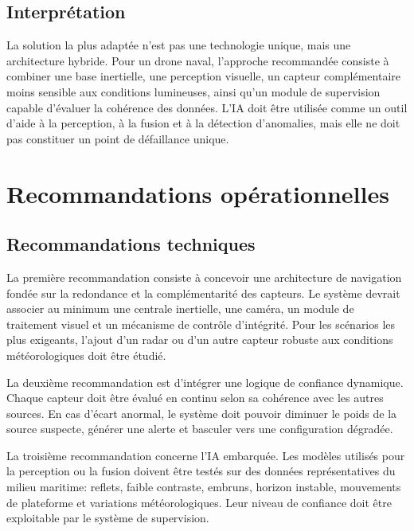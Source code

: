 \documentclass[12pt, a4paper, twoside, openright]{report}
\begin{document}
\section{Interprétation}
La solution la plus adaptée n’est pas une technologie unique, mais une architecture hybride. Pour un drone naval, l’approche recommandée consiste à combiner une base inertielle, une perception visuelle, un capteur complémentaire moins sensible aux conditions lumineuses, ainsi qu’un module de supervision capable d’évaluer la cohérence des données. L’IA doit être utilisée comme un outil d’aide à la perception, à la fusion et à la détection d’anomalies, mais elle ne doit pas constituer un point de défaillance unique.

\cleardoublepage

\chapter{Recommandations opérationnelles}\label{chap:recommandations}

\section{Recommandations techniques}
La première recommandation consiste à concevoir une architecture de navigation fondée sur la redondance et la complémentarité des capteurs. Le système devrait associer au minimum une centrale inertielle, une caméra, un module de traitement visuel et un mécanisme de contrôle d’intégrité. Pour les scénarios les plus exigeants, l’ajout d’un radar ou d’un autre capteur robuste aux conditions météorologiques doit être étudié.

La deuxième recommandation est d’intégrer une logique de confiance dynamique. Chaque capteur doit être évalué en continu selon sa cohérence avec les autres sources. En cas d’écart anormal, le système doit pouvoir diminuer le poids de la source suspecte, générer une alerte et basculer vers une configuration dégradée.

La troisième recommandation concerne l’IA embarquée. Les modèles utilisés pour la perception ou la fusion doivent être testés sur des données représentatives du milieu maritime: reflets, faible contraste, embruns, horizon instable, mouvements de plateforme et variations météorologiques. Leur niveau de confiance doit être exploitable par le système de supervision.
\end{document}
